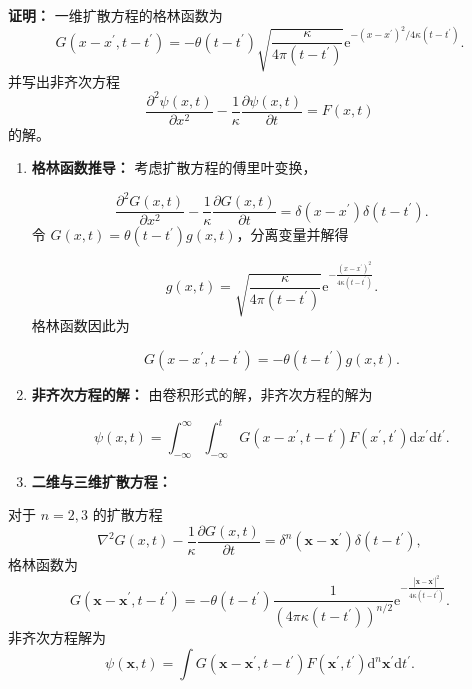 \textbf{证明：} 一维扩散方程的格林函数为
 $$
G\left(x-x^{\prime}, t-t^{\prime}\right)=-\theta\left(t-t^{\prime}\right) \sqrt{\frac{\kappa}{4 \pi\left(t-t^{\prime}\right)}} \mathrm{e}^{-\left(x-x^{\prime}\right)^{2} / 4 \kappa\left(t-t^{\prime}\right)}.
$$
并写出非齐次方程
 $$
\frac{\partial^{2} \psi(x, t)}{\partial x^{2}}-\frac{1}{\kappa} \frac{\partial \psi(x, t)}{\partial t}=F(x, t)
$$
的解。
\begin{enumerate}

\item
  \textbf{格林函数推导：} 考虑扩散方程的傅里叶变换，

  $$
  \frac{\partial^{2} G(x, t)}{\partial x^{2}}-\frac{1}{\kappa} \frac{\partial G(x, t)}{\partial t} = \delta(x-x^{\prime}) \delta(t-t^{\prime}).
  $$
  令 $G(x, t)=\theta(t-t^{\prime}) g(x, t)$，分离变量并解得

  $$
  g(x, t) = \sqrt{\frac{\kappa}{4 \pi (t-t^{\prime})}} \mathrm{e}^{-\frac{\left(x-x^{\prime}\right)^{2}}{4 \kappa (t-t^{\prime})}}.
  $$
  格林函数因此为

  $$
  G(x-x^{\prime}, t-t^{\prime}) = -\theta(t-t^{\prime}) g(x, t).
  $$
\item
  \textbf{非齐次方程的解：} 由卷积形式的解，非齐次方程的解为

  $$
  \psi(x, t) = \int_{-\infty}^{\infty} \int_{-\infty}^{t} G(x-x^{\prime}, t-t^{\prime}) F(x^{\prime}, t^{\prime}) \mathrm{d} x^{\prime} \mathrm{d} t^{\prime}.
  $$


\item
  \textbf{二维与三维扩散方程：}
\end{enumerate}

对于 $n=2, 3$ 的扩散方程
 $$
\nabla^{2} G(x, t)-\frac{1}{\kappa} \frac{\partial G(x, t)}{\partial t} = \delta^{n}\left(\mathbf{x}-\mathbf{x}^{\prime}\right) \delta(t-t^{\prime}),
$$
格林函数为
 $$
G(\mathbf{x}-\mathbf{x}^{\prime}, t-t^{\prime}) = -\theta(t-t^{\prime}) \frac{1}{(4 \pi \kappa (t-t^{\prime}))^{n/2}} \mathrm{e}^{-\frac{|\mathbf{x}-\mathbf{x}^{\prime}|^{2}}{4 \kappa (t-t^{\prime})}}.
$$
非齐次方程解为
 $$
\psi(\mathbf{x}, t) = \int G(\mathbf{x}-\mathbf{x}^{\prime}, t-t^{\prime}) F(\mathbf{x}^{\prime}, t^{\prime}) \mathrm{d}^{n} \mathbf{x}^{\prime} \mathrm{d} t^{\prime}.
$$